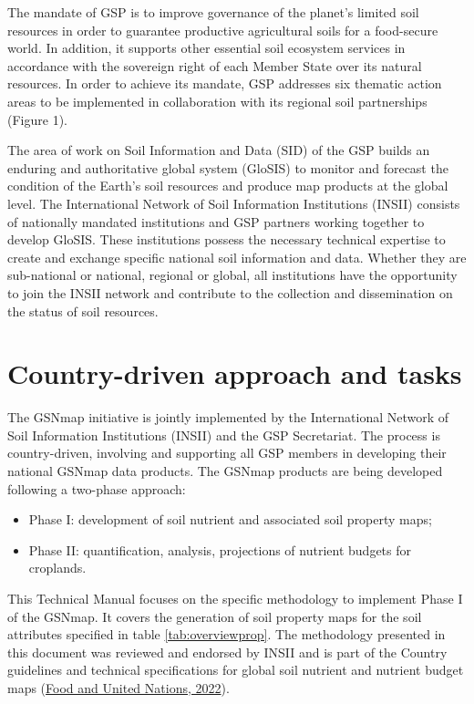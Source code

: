 \documentclass[
  10pt,
  b5paper,
  oneside]{book}
\providecommand{\tightlist}{%
  \setlength{\itemsep}{0pt}\setlength{\parskip}{0pt}}
\begin{document}
The mandate of GSP is to improve governance of the planet's limited soil resources in order to guarantee productive agricultural soils for a food-secure world. In addition, it supports other essential soil ecosystem services in accordance with the sovereign right of each Member State over its natural resources. In order to achieve its mandate, GSP addresses six thematic action areas to be implemented in collaboration with its regional soil partnerships (Figure 1).

The area of work on Soil Information and Data (SID) of the GSP builds an enduring and authoritative global system (GloSIS) to monitor and forecast the condition of the Earth's soil resources and produce map products at the global level. The International Network of Soil Information Institutions (INSII) consists of nationally mandated institutions and GSP partners working together to develop GloSIS. These institutions possess the necessary technical expertise to create and exchange specific national soil information and data. Whether they are sub-national or national, regional or global, all institutions have the opportunity to join the INSII network and contribute to the collection and dissemination on the status of soil resources.

\hypertarget{country-driven-approach-and-tasks}{%
\section{Country-driven approach and tasks}\label{country-driven-approach-and-tasks}}

The GSNmap initiative is jointly implemented by the International Network of Soil Information Institutions (INSII) and the GSP Secretariat. The process is country-driven, involving and supporting all GSP members in developing their national GSNmap data products. The GSNmap products are being developed following a two-phase approach:

\begin{itemize}
\tightlist
\item
  Phase I: development of soil nutrient and associated soil property maps;
\item
  Phase II: quantification, analysis, projections of nutrient budgets for croplands.
\end{itemize}

This Technical Manual focuses on the specific methodology to implement Phase I of the GSNmap. It covers the generation of soil property maps for the soil attributes specified in table \ref{tab:overviewprop}. The methodology presented in this document was reviewed and endorsed by INSII and is part of the Country guidelines and technical specifications for global soil nutrient and nutrient budget maps (\protect\hyperlink{ref-FAO2022b}{Food and United Nations, 2022}).
\end{document}
